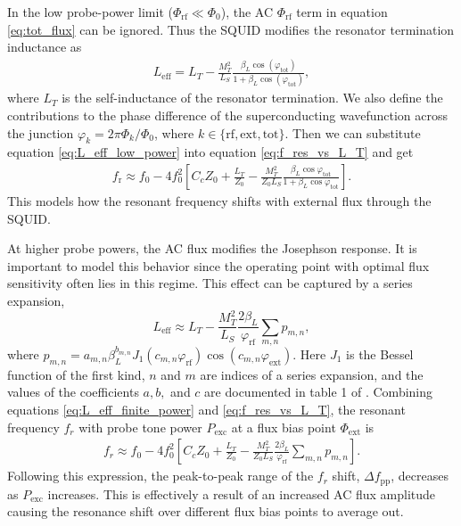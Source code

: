 \documentclass[
 prd,
 reprint,
 superscriptaddress,
 amsmath,amssymb,
 aps,
 floatfix,
]{revtex4-2}
\begin{document}
In the low probe-power limit ($\Phi_{\mathrm{rf}} \ll \Phi_0$), the AC $\Phi_{\text{rf}}$ term in equation \eqref{eq:tot_flux} can be ignored. Thus the SQUID modifies the resonator termination inductance as \cite{mates_microwave_2011}
\begin{gather} \label{eq:L_eff_low_power}
    L_{\text{eff}} = L_T - \frac{M_T^2}{L_S} \frac{\beta_L \cos(\varphi_{\text{tot}})}{1+\beta_L \cos(\varphi_{\text{tot}})},
\end{gather}
where $L_T$ is the self-inductance of the resonator termination. We also define the contributions to the phase difference of the superconducting wavefunction across the junction $\varphi_k = 2\pi \Phi_k/\Phi_0$, where \mbox{$k\in\{\text{rf}, \text{ext}, \text{tot}\}$}. Then we can substitute equation \eqref{eq:L_eff_low_power} into equation \eqref{eq:f_res_vs_L_T} and get
\begin{gather} \label{eq:squid_dispersion_low_pwr}
f_{\text{r}} \approx f_0 - 4f_0^2\left[C_c Z_0 + \frac{L_T}{Z_0} - \frac{M_T^2}{Z_0 L_S} \frac{\beta_L \cos{\varphi_{\text{tot}}}}{1+\beta_L \cos{\varphi_{\text{tot}}}}\right].
\end{gather}
This models how the resonant frequency shifts with external flux through the SQUID.


At higher probe powers, the AC flux modifies the Josephson response. It is important to model this behavior since the operating point with optimal flux sensitivity often lies in this regime. This effect can be captured by a series expansion,
\begin{equation} \label{eq:L_eff_finite_power}
L_{\mathrm{eff}} \approx L_T - \frac{M_T^2}{L_S}
\frac{2\beta_L}{\varphi_{\mathrm{rf}}}
\sum_{m,n} p_{m,n},
\end{equation}
where $p_{m,n} = a_{m,n} \beta_L^{b_{m,n}} J_1(c_{m,n}\varphi_{\text{rf}}) \cos(c_{m,n} \varphi_{\text{ext}})$. Here $J_1$ is the Bessel function of the first kind, $n$ and $m$ are indices of a series expansion, and the values of the coefficients $a, b,$ and $c$ are documented in table 1 of \cite{wegner_analytical_2022}. Combining equations \eqref{eq:L_eff_finite_power} and \eqref{eq:f_res_vs_L_T}, the resonant frequency $f_r$ with probe tone power $P_{\text{exc}}$ at a flux bias point $\Phi_{\text{ext}}$ is
\begin{gather} \label{eq:squid_dispersion_finite_pwr}
    f_r \approx f_0 - 4 f_0^2 \left[ C_c Z_0 + \frac{L_T}{Z_0} - \frac{M_T^2}{Z_0 L_S} \frac{2 \beta_L}{\varphi_{\text{rf}}} \sum_{m,n} p_{m,n}\right].
\end{gather}
Following this expression, the peak-to-peak range of the $f_r$ shift, $\Delta f_{\text{pp}}$, decreases as $P_{\text{exc}}$ increases. This is effectively a result of an increased AC flux amplitude causing the resonance shift over different flux bias points to average out.
\end{document}
